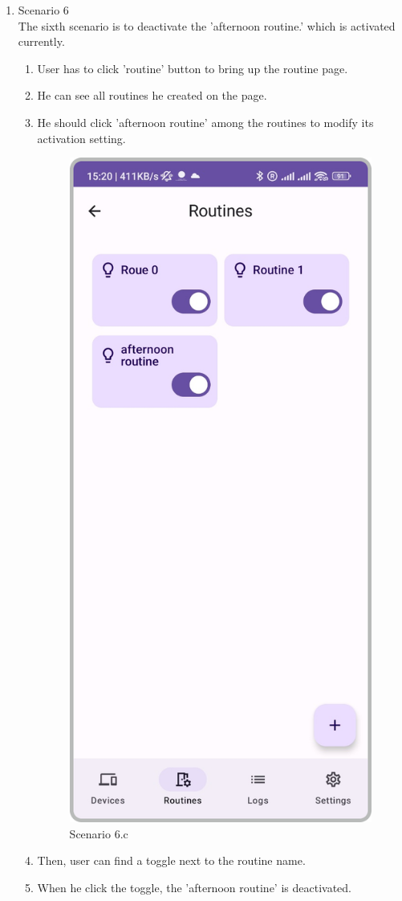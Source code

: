 \begin{enumerate}
    \item Scenario 6\\
    The sixth scenario is to deactivate the 'afternoon routine.' which is activated currently.\\
    \begin{enumerate}
        \item User has to click 'routine' button to bring up the routine page.\\
        \item He can see all routines he created on the page.\\
        \item He should click 'afternoon routine' among the routines to modify its activation setting.\\
        \begin{figure}
            \centering
            \includegraphics[width=0.5\linewidth]{imgs//usercase/scenario6-a.png}
            \caption{Scenario 6.c}
            \label{fig:enter-label}
        \end{figure}
        \item Then, user can find a toggle next to the routine name.\\
        \item When he click the toggle, the 'afternoon routine' is deactivated.\\

\end{enumerate}
\end{enumerate}

